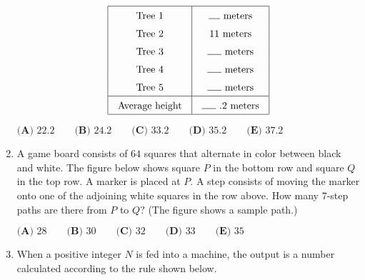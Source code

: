 \documentclass{article}
\begin{document}
\begin{enumerate}[label=\arabic*., itemsep=0.5em]
\begin{equation*}
\begingroup
\setlength{\tabcolsep}{10pt}
\renewcommand{\arraystretch}{1.5}
\begin{tabular}{|c|c|}
\hline Tree 1 & \rule{0.4cm}{0.15mm} meters \\
Tree 2 & 11 meters \\
Tree 3 & \rule{0.5cm}{0.15mm} meters \\
Tree 4 & \rule{0.5cm}{0.15mm} meters \\
Tree 5 & \rule{0.5cm}{0.15mm} meters \\ \hline
Average height & \rule{0.5cm}{0.15mm}\text{ .}2 meters \\
\hline
\end{tabular}
\endgroup
\end{equation*}

\(\textbf{(A) }22.2 \qquad \textbf{(B) }24.2 \qquad \textbf{(C) }33.2 \qquad \textbf{(D) }35.2 \qquad \textbf{(E) }37.2\)\par \vspace{0.5em}\item A game board consists of \(64\) squares that alternate in color between black and white. The figure below shows square \(P\) in the bottom row and square \(Q\) in the top row. A marker is placed at \(P.\) A step consists of moving the marker onto one of the adjoining white squares in the row above. How many \(7\)-step paths are there from \(P\) to \(Q?\) (The figure shows a sample path.)


\begin{center}
\end{center}


\(\textbf{(A) }28 \qquad \textbf{(B) }30 \qquad \textbf{(C) }32 \qquad \textbf{(D) }33 \qquad \textbf{(E) }35\)\par \vspace{0.5em}\item When a positive integer \(N\) is fed into a machine, the output is a number calculated according to the rule shown below.



\end{enumerate}
\end{document}
